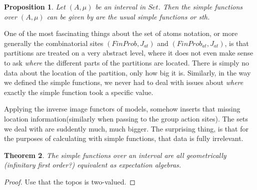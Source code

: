 \documentclass[a4paper]{amsproc}
\theoremstyle{plain}
\newtheorem{theorem}{Theorem}[section]
\newtheorem{proposition}[theorem]{Proposition}
\theoremstyle{definition}
\theoremstyle{remark}
\numberwithin{equation}{section}
\begin{document}
\begin{proposition}
    Let $(A,\mu)$ be an interval in $Set$. Then the simple functions over $(A,\mu)$ can be given by are the usual simple functions or sth.
\end{proposition}

One of the most fascinating things about the set of atoms notation, or more generally the combinatorial sites $(FinProb,J_{at})$ and $(FinProb_{at}, J_{at})$, is that partitions are treated on a very abstract level, where it does not even make sense to ask \emph{where} the different parts of the partitions are located. There is simply no data about the location of the partition, only how big it is. Similarly, in the way we defined the simple functions, we never had to deal with issues about \emph{where} exactly the simple function took a specific value.

Applying the inverse image functors of models, somehow inserts that missing location information(similarly when passing to the group action sites). The sets we deal with are suddently much, much bigger. The surprising thing, is that for the purposes of calculating with simple functions, that data is fully irrelevant.

\begin{theorem}
    The simple functions over an interval are all geometrically (infinitary first order?) equivalent as expectation algebras.
\end{theorem}
\begin{proof}
    Use that the topos is two-valued.
\end{proof}

\end{document}

